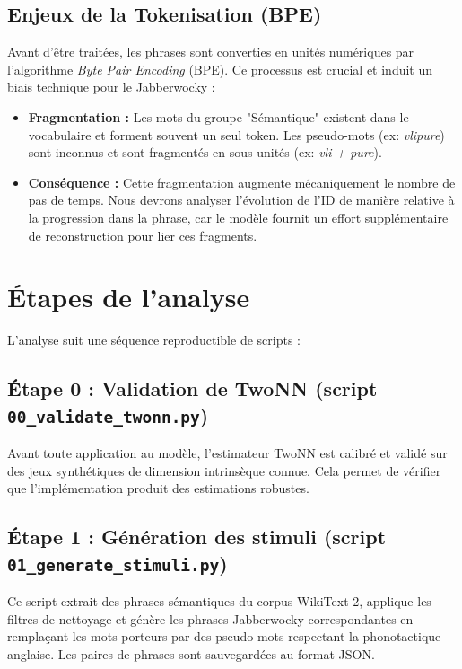 \subsection{Enjeux de la Tokenisation (BPE)}
Avant d'être traitées, les phrases sont converties en unités numériques par l'algorithme \textit{Byte Pair Encoding} (BPE). Ce processus est crucial et induit un biais technique pour le Jabberwocky :
\begin{itemize}
    \item \textbf{Fragmentation :} Les mots du groupe "Sémantique" existent dans le vocabulaire et forment souvent un seul token. Les pseudo-mots (ex: \textit{vlipure}) sont inconnus et sont fragmentés en sous-unités (ex: \textit{vli + pure}).
    \item \textbf{Conséquence :} Cette fragmentation augmente mécaniquement le nombre de pas de temps. Nous devrons analyser l'évolution de l'ID de manière relative à la progression dans la phrase, car le modèle fournit un effort supplémentaire de reconstruction pour lier ces fragments.
\end{itemize}

\section{Étapes de l'analyse}

L'analyse suit une séquence reproductible de scripts :

\subsection{Étape 0 : Validation de TwoNN (script \texttt{00\_validate\_twonn.py})}
Avant toute application au modèle, l'estimateur TwoNN est calibré et validé sur des jeux synthétiques de dimension intrinsèque connue. Cela permet de vérifier que l'implémentation produit des estimations robustes.

\subsection{Étape 1 : Génération des stimuli (script \texttt{01\_generate\_stimuli.py})}
Ce script extrait des phrases sémantiques du corpus WikiText-2, applique les filtres de nettoyage et génère les phrases Jabberwocky correspondantes en remplaçant les mots porteurs par des pseudo-mots respectant la phonotactique anglaise. Les paires de phrases sont sauvegardées au format JSON.

